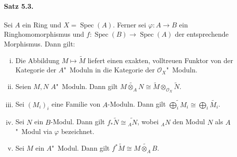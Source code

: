 \paragraph{Satz 5.3.}\label{5.3} Sei $A$ ein Ring und $X=\operatorname{Spec}(A)$. Ferner sei $\varphi:A\to B$ ein Ringhomomorphismus und $f:\operatorname{Spec}(B)\to \operatorname{Spec}(A)$ der entsprechende Morphismus. Dann gilt:
\begin{enumerate}[(i)]
\item Die Abbildung $M\mapsto\widetilde{M}$ liefert einen exakten, volltreuen Funktor von der Kategorie der $A$"~Moduln in die Kategorie der $\mathcal{O}_X$"~Moduln.
\item Seien $M,N$ $A$"~Moduln. Dann gilt $\widetilde{M\otimes_AN}\cong \widetilde{M}\otimes_{\mathcal{O}_X}\widetilde{N}$.
\item Sei $(M_i)_i$ eine Familie von $A$-Moduln. Dann gilt $\widetilde{\bigoplus_i M_i}\cong\bigoplus_i\widetilde{M_i}$.
\item Sei $N$ ein $B$-Modul. Dann gilt $f_\ast\widetilde{N}\cong \widetilde{_AN}$, wobei $_AN$ den Modul $N$ als $A$"~Modul via $\varphi$ bezeichnet.
\item Sei $M$ ein $A$"~Modul. Dann gilt $f^\ast\widetilde{M}\cong \widetilde{M\otimes_A B}$.
\end{enumerate}

